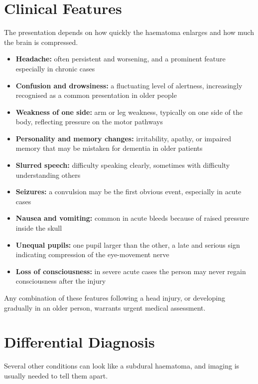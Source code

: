 \section*{Clinical Features}
The presentation depends on how quickly the haematoma enlarges and how much the brain is compressed.

\begin{itemize}
    \item \textbf{Headache:} often persistent and worsening, and a prominent feature especially in chronic cases
    \item \textbf{Confusion and drowsiness:} a fluctuating level of alertness, increasingly recognised as a common presentation in older people
    \item \textbf{Weakness of one side:} arm or leg weakness, typically on one side of the body, reflecting pressure on the motor pathways
    \item \textbf{Personality and memory changes:} irritability, apathy, or impaired memory that may be mistaken for dementia in older patients
    \item \textbf{Slurred speech:} difficulty speaking clearly, sometimes with difficulty understanding others
    \item \textbf{Seizures:} a convulsion may be the first obvious event, especially in acute cases
    \item \textbf{Nausea and vomiting:} common in acute bleeds because of raised pressure inside the skull
    \item \textbf{Unequal pupils:} one pupil larger than the other, a late and serious sign indicating compression of the eye-movement nerve
    \item \textbf{Loss of consciousness:} in severe acute cases the person may never regain consciousness after the injury
\end{itemize}

Any combination of these features following a head injury, or developing gradually in an older person, warrants urgent medical assessment.

\section*{Differential Diagnosis}
Several other conditions can look like a subdural haematoma, and imaging is usually needed to tell them apart.

